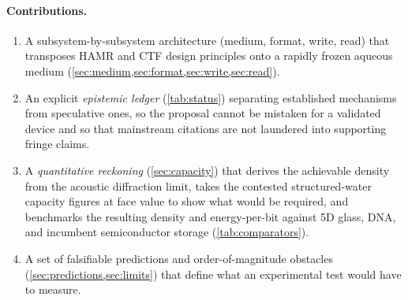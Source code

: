 \documentclass[11pt]{article}
\theoremstyle{definition}
\begin{document}
\paragraph{Contributions.}
\begin{enumerate}[leftmargin=1.6em,nosep]
  \item A subsystem-by-subsystem architecture (medium, format, write, read) that
  transposes HAMR and CTF design principles onto a rapidly frozen aqueous medium
  (\cref{sec:medium,sec:format,sec:write,sec:read}).
  \item An explicit \emph{epistemic ledger} (\cref{tab:status}) separating established
  mechanisms from speculative ones, so the proposal cannot be mistaken for a validated
  device and so that mainstream citations are not laundered into supporting fringe claims.
  \item A \emph{quantitative reckoning} (\cref{sec:capacity}) that derives the achievable
  density from the acoustic diffraction limit, takes the contested structured-water capacity
  figures at face value to show what would be required, and benchmarks the resulting density
  and energy-per-bit against 5D glass, DNA, and incumbent semiconductor storage
  (\cref{tab:comparators}).
  \item A set of falsifiable predictions and order-of-magnitude obstacles
  (\cref{sec:predictions,sec:limits}) that define what an experimental test would have to
  measure.
\end{enumerate}
\end{document}
